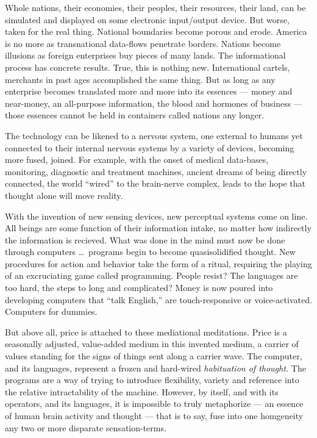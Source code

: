Whole nations, their economies, their peoples, their resources, their land, can be simulated and displayed on some electronic input/output device. But worse, taken for the real thing. National boundaries become porous and erode. America is no more as trans\-national data-flows penetrate borders. Nations become illusions as foreign enterprises buy pieces of many lands. The informational process has concrete results. True, this is nothing new. International cartels, merchants in past ages accomplished the same thing. But as long as any enterprise becomes translated more and more into its essences --- money and near-money, an all-purpose information, the blood and hormones of business --- those essences cannot be held in containers called nations any longer.

The technology can be likened to a nervous system, one external to humans yet connected to their internal nervous systems by a variety of devices, becoming more fused, joined. For example, with the onset of medical data-bases, monitoring, diagnostic and treatment machines, ancient dreams of being directly connected, the world \enquote{wired} to the brain-nerve complex, leads to the hope that thought alone will move reality.

With the invention of new sensing devices, new perceptual systems come on line. All beings are some function of their information intake, no matter how indirectly the information is recieved. What was done in the mind must now be done through computers \ldots\ programs begin to become quasisolidified thought. New procedures for action and behavior take the form of a ritual, requiring the playing of an excruciating game called programming. People resist? The languages are too hard, the steps to long and complicated? Money is now poured into developing computers that \enquote{talk English,} are touch-responsive or voice-activated. Computers for dummies.

But above all, price is attached to these mediational meditations. Price is a seasonally adjusted, value-added medium in this invented medium, a carrier of values standing for the signs of things sent along a carrier wave. The computer, and its languages, represent a frozen and hard-wired \emph{habituation of thought.} The programs are a way of trying to introduce flexibility, variety and reference into the relative intractability of the machine. However, by itself, and with its operators, and its languages, it is impossible to truly metaphorize --- an essence of human brain activity and thought --- that is to say, fuse into one homgeneity any two or more disparate sensation-terms.

